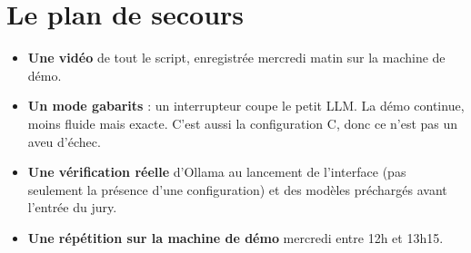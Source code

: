 \section{Le plan de secours}

\begin{itemize}
  \item \textbf{Une vidéo} de tout le script, enregistrée mercredi matin sur la machine de démo.
  \item \textbf{Un mode gabarits} : un interrupteur coupe le petit LLM. La démo continue, moins
        fluide mais exacte. C'est aussi la configuration C, donc ce n'est pas un aveu d'échec.
  \item \textbf{Une vérification réelle} d'Ollama au lancement de l'interface (pas seulement la
        présence d'une configuration) et des modèles préchargés avant l'entrée du jury.
  \item \textbf{Une répétition sur la machine de démo} mercredi entre 12h et 13h15.
\end{itemize}
